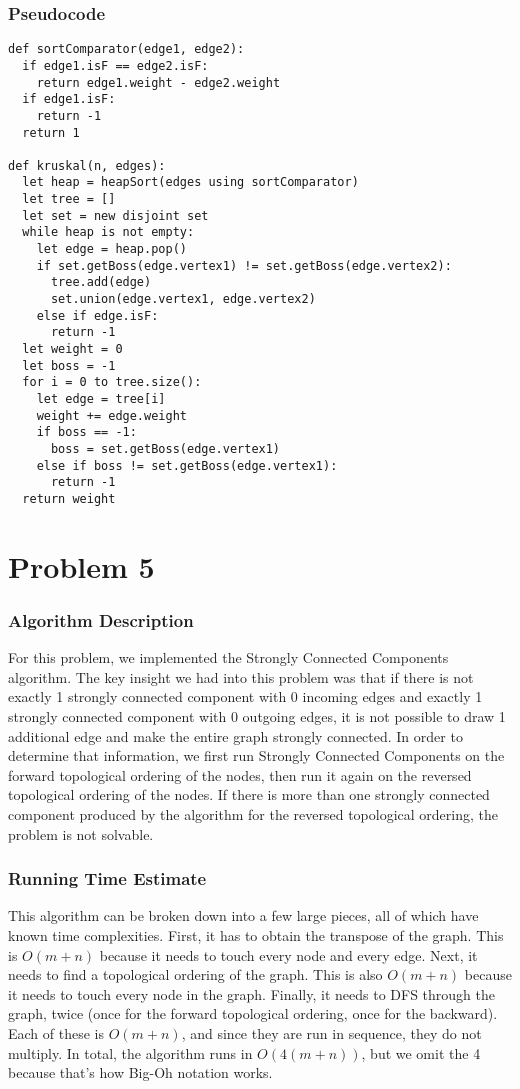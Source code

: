 \documentclass{math}
\begin{document}
\subsubsection*{Pseudocode}
\begin{lstlisting}
def sortComparator(edge1, edge2):
  if edge1.isF == edge2.isF:
    return edge1.weight - edge2.weight
  if edge1.isF:
    return -1
  return 1

def kruskal(n, edges):
  let heap = heapSort(edges using sortComparator)
  let tree = []
  let set = new disjoint set
  while heap is not empty:
    let edge = heap.pop()
    if set.getBoss(edge.vertex1) != set.getBoss(edge.vertex2):
      tree.add(edge)
      set.union(edge.vertex1, edge.vertex2)
    else if edge.isF:
      return -1
  let weight = 0
  let boss = -1
  for i = 0 to tree.size():
    let edge = tree[i]
    weight += edge.weight
    if boss == -1:
      boss = set.getBoss(edge.vertex1)
    else if boss != set.getBoss(edge.vertex1):
      return -1
  return weight
\end{lstlisting}

\section*{Problem 5}

\subsubsection*{Algorithm Description}
For this problem, we implemented the Strongly Connected Components algorithm.
The key insight we had into this problem was that if there is not exactly 1
strongly connected component with 0 incoming edges and exactly 1 strongly
connected component with 0 outgoing edges, it is not possible to draw 1
additional edge and make the entire graph strongly connected.  In order to
determine that information, we first run Strongly Connected Components on the
forward topological ordering of the nodes, then run it again on the reversed
topological ordering of the nodes. If there is more than one strongly connected
component produced by the algorithm for the reversed topological ordering, the
problem is not solvable.

\subsubsection*{Running Time Estimate}
This algorithm can be broken down into a few large pieces, all of which have
known time complexities. First, it has to obtain the transpose of the graph.
This is \( O(m+n) \) because it needs to touch every node and every edge. Next,
it needs to find a topological ordering of the graph. This is also \( O(m+n) \)
because it needs to touch every node in the graph. Finally, it needs to DFS
through the graph, twice (once for the forward topological ordering, once for
the backward). Each of these is \( O(m+n) \), and since they are run in
sequence, they do not multiply. In total, the algorithm runs in
\( O(4(m+n)) \), but we omit the 4 because that's how Big-Oh notation works.
\end{document}
